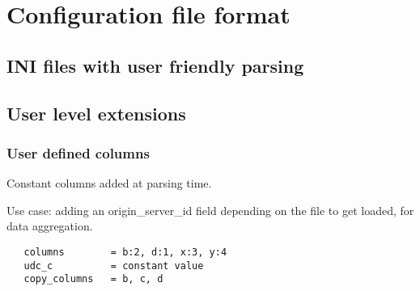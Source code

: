 \documentclass{beamer}
\begin{document}



\section{Configuration file format}
\subsection{INI files with user friendly parsing}



\subsection{User level extensions}

\begin{frame}[fragile]
  \frametitle{User defined columns}

  Constant columns added at parsing time.

  Use case: adding an origin\_server\_id field depending on the file
  to get loaded, for data aggregation.

  \begin{example}
  \begin{verbatim}
   columns        = b:2, d:1, x:3, y:4
   udc_c          = constant value
   copy_columns   = b, c, d
  \end{verbatim}
  \end{example}
\end{frame}
\end{document}
